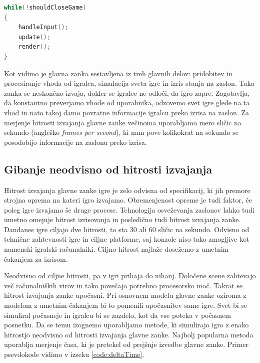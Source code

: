 \documentclass[12pt,a4paper,twoside]{book}
\begin{document}
\begin{lstlisting}[label=code:glavnaZanka, language=C++, caption=Glavna zanka igre]
while(!shouldCloseGame)
{
	handleInput();
	update();
	render();
}
\end{lstlisting}

Kot vidimo je glavna zanka sestavljena iz treh glavnih delov: pridobitev in procesiranje vhoda od igralca, simulacija sveta igre in izris stanja na zaslon. Taka zanka se neskončno izvaja, dokler se igralec ne odloči, da igro zapre. Zagotavlja, da konstantno preverjamo vhode od uporabnika, odzovemo svet igre glede na ta vhod in nato takoj damo povratne informacije igralcu preko izrisa na zaslon. Za merjenje hitrosti izvajanja glavne zanke večinoma uporabljamo mero sličic na sekundo (angleško \textit{frames per second}), ki nam pove kolikokrat na sekundo se posodobijo informacije na zaslonu preko izrisa.

\subsection{Gibanje neodvisno od hitrosti izvajanja}
Hitrost izvajanja glavne zanke igre je zelo odvisna od specifikacij, ki jih premore strojna oprema na kateri igro izvajamo. Obremenjenost opreme je tudi faktor, če poleg igre izvajamo še druge procese. Tehnologija osveževanja zaslonov lahko tudi umetno omejuje hitrost izrisovanja in posledično tudi hitrost izvajanja zanke. Dandanes igre ciljajo dve hitrosti, to sta 30 ali 60 sličic na sekundo. Odvisno od tehnične zahtevnosti igre in ciljne platforme, saj konzole niso tako zmogljive kot namenski igralski računalniki. Ciljno hitrost najlaže dosežemo z umetnim čakanjem za izrisom. 

Neodvisno od ciljne hitrosti, pa v igri prihaja do nihanj. Določene scene zahtevajo več računalniških virov in tako povečajo potrebno procesorsko moč. Takrat se hitrost izvajanja zanke upočasni. Pri osnovnem modelu glavne zanke oziroma z modelom z umetnim čakanjem bi to pomenili upočasnitev same igre. Svet bi se simuliral počasneje in igralcu bi se zazdelo, kot da vse poteka v počasnem posnetku. Da se temu izognemo uporabljamo metode, ki simulirajo igro z enako hitrostjo neodvisno od hitrosti izvajanja glavne zanke. Najbolj popularna metoda uporablja merjenje časa, ki je pretekel od prejšnje izvedbe glavne zanke. Primer psevdokode vidimo v izseku \ref{code:deltaTime}.
\end{document}

